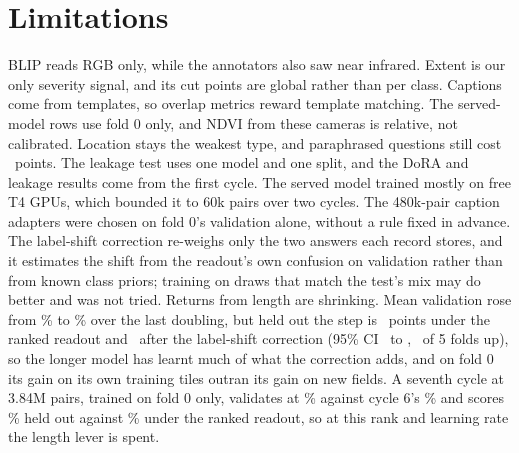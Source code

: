 \documentclass[10pt,twocolumn]{article}
\begin{document}
\section{Limitations}
BLIP reads RGB only, while the annotators also saw near infrared. Extent is our only severity signal, and its cut points are global rather than per class. Captions come from templates, so overlap metrics reward template matching. The served-model rows use fold 0 only, and NDVI from these cameras is relative, not calibrated. Location stays the weakest type, and paraphrased questions still cost \blipParaphraseDrop\ points. The leakage test uses one model and one split, and the DoRA and leakage results come from the first cycle. The served model trained mostly on free T4 GPUs, which bounded it to 60k pairs over two cycles. The 480k-pair caption adapters were chosen on fold 0's validation alone, without a rule fixed in advance. The label-shift correction re-weighs only the two answers each record stores, and it estimates the shift from the readout's own confusion on validation rather than from known class priors; training on draws that match the test's mix may do better and was not tried. Returns from length are shrinking. Mean validation rose from \prevVal\% to \finalVal\% over the last doubling, but held out the step is \finalChange\ points under the ranked readout and \corrStep\ after the label-shift correction (95\% CI \corrStepLo\ to \corrStepHi, \corrStepFolds\ of 5 folds up), so the longer model has learnt much of what the correction adds, and on fold 0 its gain on its own training tiles outran its gain on new fields. A seventh cycle at 3.84M pairs, trained on fold 0 only, validates at \sevenVal\% against cycle 6's \sixValZero\% and scores \sevenHeldZero\% held out against \sixHeldZero\% under the ranked readout, so at this rank and learning rate the length lever is spent.
\end{document}
